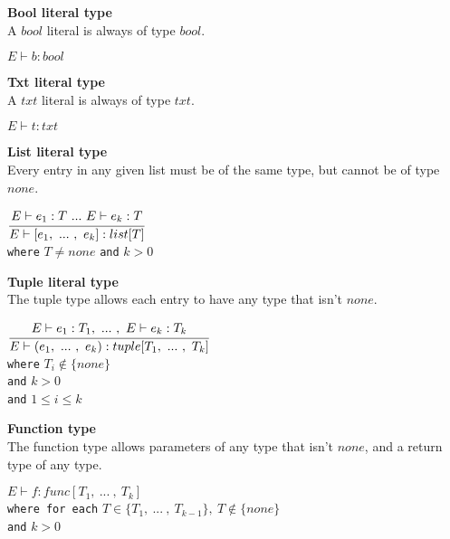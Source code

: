 \textbf{Bool literal type}\\
A $bool$ literal is always of type $bool$.

\begin{center}
	\begin{math}
	E \vdash b : bool
	\end{math}
\end{center}

\textbf{Txt literal type}\\
A $txt$ literal is always of type $txt$.

\begin{center}
	\begin{math}
	E \vdash t : txt
	\end{math}
\end{center}

\textbf{List literal type}\\
Every entry in any given list must be of the same type, but cannot be of type $none$.

\begin{center}
	\begin{math}
	\cfrac
	{E \vdash e_1 : T\ .
		.
		.
		\ E \vdash e_k : T}
	{E \vdash [e_1,\ .
		.
		.
		\ , \ e_k] : list[T]}
	\end{math}
	\\[1\baselineskip]
	\texttt{where} $T \neq none$
	\texttt{and} $k > 0$
\end{center}

\textbf{Tuple literal type}\\
The tuple type allows each entry to have any type that isn't $none$.

\begin{center}
	\begin{math}
	\cfrac
	{E \vdash e_1 : T_1,\ .
	.
	.
	\ , \ E \vdash e_k : T_k}
	{E \vdash (e_1,\ .
		.
		.
		\ ,\ e_k) : tuple[T_1, \ .
		.
		.
		\ ,\ T_k]}
	\end{math}
	\\[1\baselineskip]
	\texttt{where} $T_i \notin \{none\}$\\
	\texttt{and} $k > 0$\\
	\texttt{and} $1 \le i \le k$
\end{center}

\textbf{Function type}\\
The function type allows parameters of any type that isn't $none$, and a return type of any type.

\begin{center}
	\begin{math}
	E \vdash f : func[T_1,\ .
	.
	.
	\ ,\ T_k]
	\end{math}
	\\[1\baselineskip]
	\texttt{where for each} $T \in \{T_1,\ .
	.
	.
	\ ,\ T_{k-1}\},\ T \notin \{none\}$\\
	\texttt{and} $k > 0$
\end{center}

